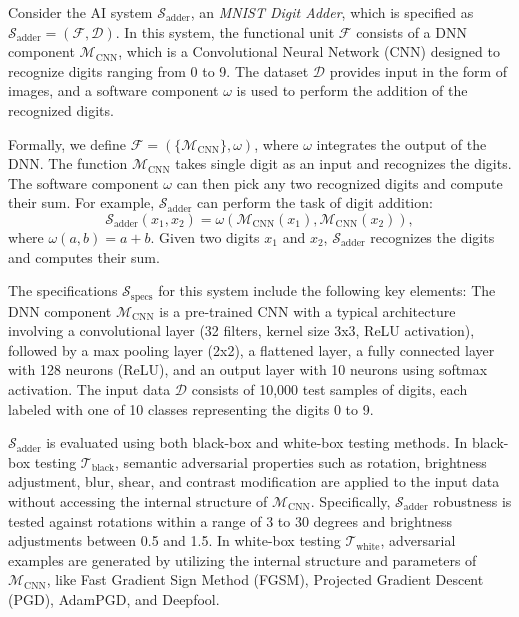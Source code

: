 \begin{example}
  \label{ex:mnist-adder-specification}
  Consider the AI system $\mathcal{S}_{\text{adder}}$, an \emph{MNIST Digit Adder}, which is specified as $\mathcal{S}_{\text{adder}} = (\mathcal{F}, \mathcal{D})$. In this system, the functional unit $\mathcal{F}$ consists of a DNN component $\mathcal{M}_{\text{CNN}}$, which is a Convolutional Neural Network (CNN) designed to recognize digits ranging from 0 to 9. The dataset $\mathcal{D}$ provides input in the form of images, and a software component $\omega$ is used to perform the addition of the recognized digits. 

  Formally, we define $\mathcal{F} = (\{\mathcal{M}_{\text{CNN}}\}, \omega)$, where $\omega$ integrates the output of the DNN. The function $\mathcal{M}_{\text{CNN}}$ takes single digit as an input and recognizes the digits. The software component $\omega$ can then pick any two recognized digits and compute their sum. For example, $\mathcal{S}_{\text{adder}}$ can perform the task of digit addition:
  \begin{equation}
    \mathcal{S}_{\text{adder}}(x_1, x_2) = \omega(\mathcal{M}_{\text{CNN}}(x_1), \mathcal{M}_{\text{CNN}}(x_2)),
  \end{equation}
  where $\omega(a, b) = a + b$. Given two digits $x_1$ and $x_2$, $\mathcal{S}_{\text{adder}}$ recognizes the digits and computes their sum.

  The specifications $\mathcal{S}_{\text{specs}}$ for this system include the following key elements: The DNN component $\mathcal{M}_{\text{CNN}}$ is a pre-trained CNN with a typical architecture involving a convolutional layer (32 filters, kernel size 3x3, ReLU activation), followed by a max pooling layer (2x2), a flattened layer, a fully connected layer with 128 neurons (ReLU), and an output layer with 10 neurons using softmax activation. The input data $\mathcal{D}$ consists of 10,000 test samples of digits, each labeled with one of 10 classes representing the digits 0 to 9. 

  $\mathcal{S}_{\text{adder}}$ is evaluated using both black-box and white-box testing methods. In black-box testing $\mathcal{T}_{\text{black}}$, semantic adversarial properties such as rotation, brightness adjustment, blur, shear, and contrast modification are applied to the input data without accessing the internal structure of $\mathcal{M}_{\text{CNN}}$. Specifically, $\mathcal{S}_{\text{adder}}$ robustness is tested against rotations within a range of 3 to 30 degrees and brightness adjustments between 0.5 and 1.5. In white-box testing $\mathcal{T}_{\text{white}}$, adversarial examples are generated by utilizing the internal structure and parameters of $\mathcal{M}_{\text{CNN}}$, like Fast Gradient Sign Method (FGSM), Projected Gradient Descent (PGD), AdamPGD, and Deepfool.
\end{example}


